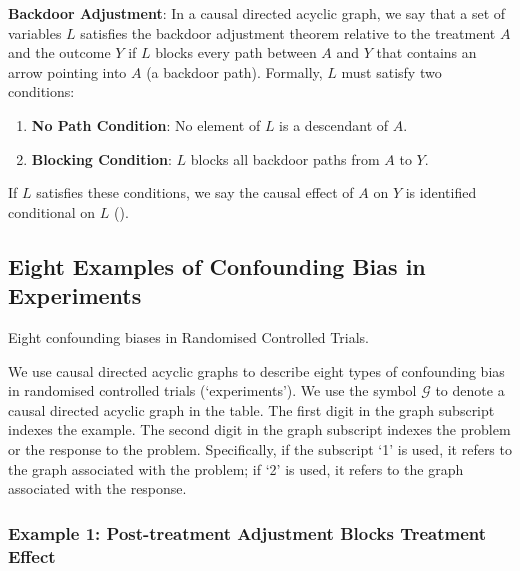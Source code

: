 \documentclass[
  single column]{article}
\providecommand{\tightlist}{%
  \setlength{\itemsep}{0pt}\setlength{\parskip}{0pt}}\usepackage{longtable,booktabs,array}
\begin{document}
\textbf{Backdoor Adjustment}: In a causal directed acyclic graph, we say
that a set of variables \(L\) satisfies the backdoor adjustment theorem
relative to the treatment \(A\) and the outcome \(Y\) if \(L\) blocks
every path between \(A\) and \(Y\) that contains an arrow pointing into
\(A\) (a backdoor path). Formally, \(L\) must satisfy two conditions:

\begin{enumerate}
\def\labelenumi{\arabic{enumi}.}
\tightlist
\item
  \textbf{No Path Condition}: No element of \(L\) is a descendant of
  \(A\).
\item
  \textbf{Blocking Condition}: \(L\) blocks all backdoor paths from
  \(A\) to \(Y\).
\end{enumerate}

If \(L\) satisfies these conditions, we say the causal effect of \(A\)
on \(Y\) is identified conditional on \(\boxed{L}\)
().

\subsection{Eight Examples of Confounding Bias in
Experiments}\label{eight-examples-of-confounding-bias-in-experiments}

\begin{table}

\caption{\label{tbl-terminologyelconfoundersexperiments}Eight
confounding biases in Randomised Controlled Trials.}

\centering{

\terminologyelconfoundersexperiments

}

\end{table}%

We use causal directed acyclic graphs to describe eight types of
confounding bias in randomised controlled trials (`experiments'). We use
the symbol \(\mathcal{G}\) to denote a causal directed acyclic graph in
the table. The first digit in the graph subscript indexes the example.
The second digit in the graph subscript indexes the problem or the
response to the problem. Specifically, if the subscript `1' is used, it
refers to the graph associated with the problem; if `2' is used, it
refers to the graph associated with the response.

\subsubsection{Example 1: Post-treatment Adjustment Blocks Treatment
Effect}\label{example-1-post-treatment-adjustment-blocks-treatment-effect}
\end{document}
